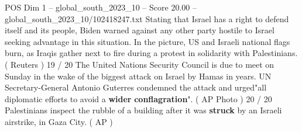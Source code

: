 \begin{textsample}{POS Dim 1 – global\_south\_2023\_10 – Score 20.00 – global\_south\_2023\_10/102418247.txt}
Stating that Israel has a right to defend itself and its people, Biden warned against any other party hostile to Israel seeking advantage in this situation.
In the picture, US and Israeli national flags burn, as Iraqis gather next to fire during a protest in solidarity with Palestinians. ( Reuters ) 19 / 20 The United Nations Security Council is due to meet on Sunday in the wake of the biggest attack on Israel by Hamas in years.
UN Secretary-General Antonio Guterres condemned the attack and urged"all diplomatic efforts to avoid a \textbf{wider} \textbf{conflagration}". ( AP Photo ) 20 / 20 Palestinians inspect the rubble of a building after it was \textbf{struck} by an Israeli airstrike, in Gaza City. ( AP )

\end{textsample}
